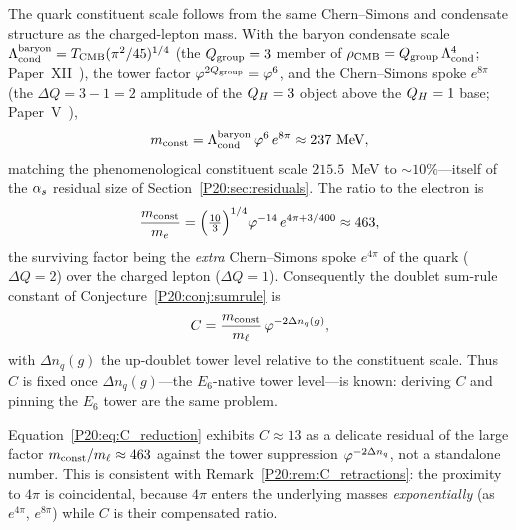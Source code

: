 \begin{proposition}
\label{P20:prop:constituent}
The quark constituent scale follows from the same Chern--Simons and
condensate structure as the charged-lepton mass. With the baryon
condensate scale $\Lambda_{\mathrm{cond}}^{\rm baryon}=T_{\mathrm{CMB}}(\pi^2/45)^{1/4}$ (the
$Q_{\mathrm{group}}=3$ member of $\rho_{\mathrm{CMB}}=Q_{\mathrm{group}}\,\Lambda_{\mathrm{cond}}^4$; Paper~XII~\cite{Paper12}), the
tower factor $\varphi^{2Q_{\mathrm{group}}}=\varphi^6$, and the Chern--Simons spoke $e^{8\pi}$
(the $\Delta Q=3-1=2$ amplitude of the $Q_H=3$ object above the $Q_H=1$
base; Paper~V~\cite{Paper5}),
\begin{equation}
  m_{\rm const}=\Lambda_{\mathrm{cond}}^{\rm baryon}\,\varphi^{6}\,e^{8\pi}\approx237~\mathrm{MeV},
  \label{P20:eq:constituent}
\end{equation}
matching the phenomenological constituent scale $215.5$~MeV to
$\sim10\%$---itself of the $\alpha_s$ residual size of
Section~\ref{P20:sec:residuals}. The ratio to the electron is
\begin{equation}
  \frac{m_{\rm const}}{m_e}
  =\Bigl(\tfrac{10}{3}\Bigr)^{1/4}\varphi^{-14}\,e^{4\pi+3/400}\approx463,
  \label{P20:eq:const_over_me}
\end{equation}
the surviving factor being the \emph{extra} Chern--Simons spoke $e^{4\pi}$
of the quark ($\Delta Q=2$) over the charged lepton ($\Delta Q=1$).
Consequently the doublet sum-rule constant of
Conjecture~\ref{P20:conj:sumrule} is
\begin{equation}
  C=\frac{m_{\rm const}}{m_\ell}\,\varphi^{-2\Delta n_q(g)},
  \label{P20:eq:C_reduction}
\end{equation}
with $\Delta n_q(g)$ the up-doublet tower level relative to the
constituent scale. Thus $C$ is fixed once $\Delta n_q(g)$---the
$E_6$-native tower level---is known: deriving $C$ and pinning the $E_6$
tower are the same problem.
\end{proposition}

\begin{remark}
\label{P20:rem:C_residual}
Equation~\eqref{P20:eq:C_reduction} exhibits $C\approx13$ as a delicate
residual of the large factor $m_{\rm const}/m_\ell\approx463$ against the
tower suppression $\varphi^{-2\Delta n_q}$, not a standalone number. This is
consistent with Remark~\ref{P20:rem:C_retractions}: the proximity to
$4\pi$ is coincidental, because $4\pi$ enters the underlying masses
\emph{exponentially} (as $e^{4\pi}$, $e^{8\pi}$) while $C$ is their
compensated ratio.
\end{remark}

